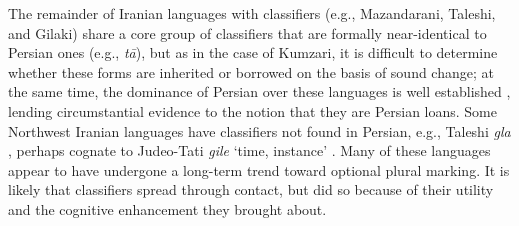 \documentclass[11pt]{article}
\begin{document}
The remainder of Iranian languages with classifiers (e.g., Mazandarani, Taleshi, and Gilaki) share a core group of classifiers that are formally near-identical to Persian ones (e.g., {\it t\=a}), but as in the case of Kumzari, %
it is difficult to determine whether these forms are inherited or borrowed on the basis of sound change; 
at the same time, the dominance of Persian  over these languages is well established \citep{Borjian2009}, lending circumstantial evidence to the notion that they are Persian loans. 
Some Northwest Iranian languages have classifiers not found in Persian, e.g., Taleshi {\it g{\textschwa}la} \citep{Paul2011,Stilo2018}, perhaps cognate to Judeo-Tati {\it gile} `time, instance' \citep[310]{Authier2012}. 
Many of these languages appear to have undergone a long-term trend toward optional plural marking. It is likely that classifiers spread through contact, but did so because of their utility and the cognitive enhancement they brought about. 


\end{document}
